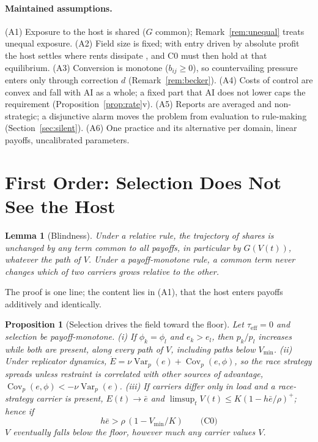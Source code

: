 \documentclass[letterpaper]{article} %
\newtheorem{proposition}{Proposition}
\newtheorem{lemma}{Lemma}
\theoremstyle{definition}
\newcommand{\Vmin}{V_{\min}}
\newcommand{\taueff}{\tau_{\mathrm{eff}}}
\begin{document}
\paragraph{Maintained assumptions.} (A1) Exposure to the host is shared ($G$ common); Remark~\ref{rem:unequal} treats unequal exposure. (A2) Field size is fixed; with entry driven by absolute profit the host settles where rents dissipate \citep{gordon1954}, and C0 must then hold at that equilibrium. (A3) Conversion is monotone ($b_{ij}\ge0$), so countervailing pressure enters only through correction $d$ (Remark~\ref{rem:becker}). (A4) Costs of control are convex and fall with AI as a whole; a fixed part that AI does not lower caps the requirement (Proposition~\ref{prop:rate}v). (A5) Reports are averaged and non-strategic; a disjunctive alarm moves the problem from evaluation to rule-making (Section~\ref{sec:silent}). (A6) One practice and its alternative per domain, linear payoffs, uncalibrated parameters.

\section{First Order: Selection Does Not See the Host}\label{sec:first}

\begin{lemma}[Blindness]\label{lem:blind}
Under a relative rule, the trajectory of shares is unchanged by any term common to all payoffs, in particular by $G(V(t))$, whatever the path of $V$. Under a payoff-monotone rule, a common term never changes which of two carriers grows relative to the other.
\end{lemma}

The proof is one line; the content lies in (A1), that the host enters payoffs additively and identically.

\begin{proposition}[Selection drives the field toward the floor]\label{prop:first}
Let $\taueff=0$ and selection be payoff-monotone. (i) If $\phi_k=\phi_l$ and $e_k>e_l$, then $p_k/p_l$ increases while both are present, along every path of $V$, including paths below $\Vmin$. (ii) Under replicator dynamics, $\dot E=\nu\operatorname{Var}_p(e)+\operatorname{Cov}_p(e,\phi)$, so the race strategy spreads unless restraint is correlated with other sources of advantage, $\operatorname{Cov}_p(e,\phi)<-\nu\operatorname{Var}_p(e)$. (iii) If carriers differ only in load and a race-strategy carrier is present, $E(t)\to\bar e$ and $\limsup_tV(t)\le K(1-h\bar e/\rho)^+$; hence if
\begin{equation}\label{eq:C0}
h\bar e>\rho\,(1-\Vmin/K)\qquad\text{(C0)}
\end{equation}
$V$ eventually falls below the floor, however much any carrier values $V$.
\end{proposition}
\end{document}
